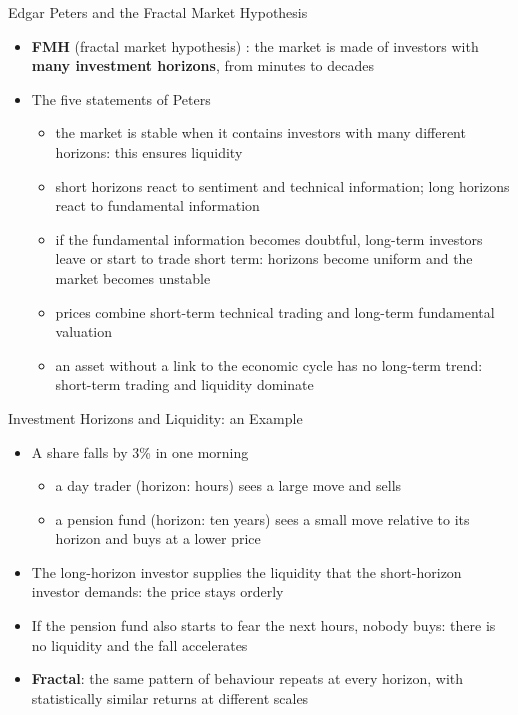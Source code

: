 \begin{frame}{Edgar Peters and the Fractal Market Hypothesis}
\itemsize{\footnotesize}
\begin{itemize}
    \item \textbf{FMH} (fractal market hypothesis) : the market is made of investors with \textbf{many investment horizons}, from minutes to decades
    \item The five statements of Peters
    \begin{itemize}
        \item the market is stable when it contains investors with many different horizons: this ensures liquidity
        \item short horizons react to sentiment and technical information; long horizons react to fundamental information
        \item if the fundamental information becomes doubtful, long-term investors leave or start to trade short term: horizons become uniform and the market becomes unstable
        \item prices combine short-term technical trading and long-term fundamental valuation
        \item an asset without a link to the economic cycle has no long-term trend: short-term trading and liquidity dominate
    \end{itemize}
\end{itemize}
\end{frame}

\begin{frame}{Investment Horizons and Liquidity: an Example}
\itemsize{\small}
\begin{itemize}
    \item A share falls by 3\% in one morning
    \begin{itemize}
        \item a day trader (horizon: hours) sees a large move and sells
        \item a pension fund (horizon: ten years) sees a small move relative to its horizon and buys at a lower price
    \end{itemize}
    \item The long-horizon investor supplies the liquidity that the short-horizon investor demands: the price stays orderly
    \item If the pension fund also starts to fear the next hours, nobody buys: there is no liquidity and the fall accelerates
    \item \textbf{Fractal}: the same pattern of behaviour repeats at every horizon, with statistically similar returns at different scales
\end{itemize}
\end{frame}

